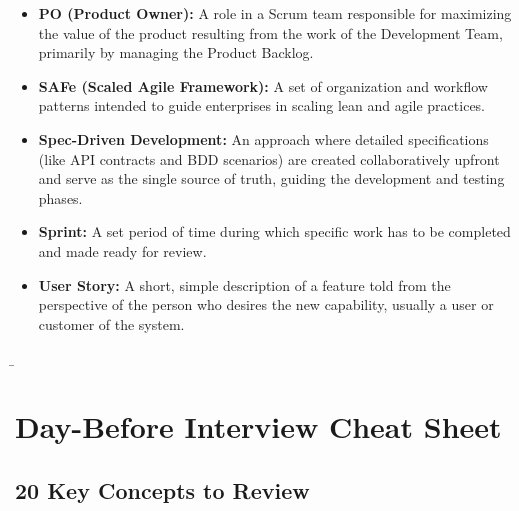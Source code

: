 \begin{itemize}
\item
  \textbf{PO (Product Owner):} A role in a Scrum team responsible for
  maximizing the value of the product resulting from the work of the
  Development Team, primarily by managing the Product Backlog.
\item
  \textbf{SAFe (Scaled Agile Framework):} A set of organization and
  workflow patterns intended to guide enterprises in scaling lean and
  agile practices.
\item
  \textbf{Spec-Driven Development:} An approach where detailed
  specifications (like API contracts and BDD scenarios) are created
  collaboratively upfront and serve as the single source of truth,
  guiding the development and testing phases.
\item
  \textbf{Sprint:} A set period of time during which specific work has
  to be completed and made ready for review.
\item
  \textbf{User Story:} A short, simple description of a feature told
  from the perspective of the person who desires the new capability,
  usually a user or customer of the system.
\end{itemize}

\bigskip

\b

\section{Day-Before Interview Cheat
Sheet}\label{day-before-interview-cheat-sheet}

\subsection{20 Key Concepts to Review}\label{key-concepts-to-review}

